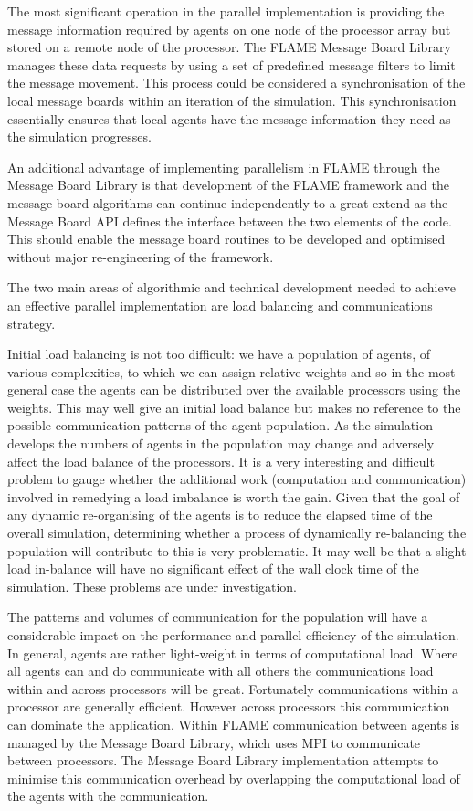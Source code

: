 The most significant operation in the parallel implementation is providing the message information required by agents on one node of the processor array but stored on a remote node of the processor. The FLAME Message Board Library manages these data requests by using a set of predefined message filters to limit the message movement. This process could be considered a synchronisation of the local message boards within an iteration of the simulation. This synchronisation essentially ensures that local agents have the message information they need as the simulation progresses.

An additional advantage of implementing parallelism in FLAME through the Message Board Library is that development of the FLAME framework and the message board algorithms can continue independently to a great extend as the Message Board API defines the interface between the two elements of the code. This should enable the message board routines to be developed and optimised without major re-engineering of the framework.

The two main areas of algorithmic and technical development needed to achieve an effective parallel implementation are load balancing and communications strategy. 

Initial load balancing is not too difficult: we have a population of agents, of various complexities, to which we can assign relative weights and so in the most general case the agents can be distributed over the available processors using the weights. This may well give an initial load balance but makes no reference to the possible communication patterns of the agent population. As the simulation develops the numbers of agents in the population may change and adversely affect the load balance of the processors. It is a very interesting and difficult problem to gauge whether the additional work (computation and communication) involved in remedying a load imbalance  is worth the gain. Given that the goal of any dynamic re-organising of the agents is to reduce the elapsed time of the overall simulation, determining whether a process of dynamically re-balancing the population will contribute to this is very problematic. It may well be that a slight load in-balance will have no significant effect of the wall clock time of the simulation. These problems are under investigation.

The patterns and volumes of communication for the population will have a considerable impact on the performance and parallel efficiency of the simulation. In general, agents are rather light-weight in terms of computational load. Where all agents can and do communicate with all others the communications load within and across processors will be great. Fortunately communications within a processor are generally efficient. However across processors this communication can dominate the application. Within FLAME communication between agents is managed by the Message Board Library, which uses MPI to communicate between processors. The Message Board Library implementation attempts to minimise this communication overhead by overlapping the computational load of the agents with the communication. 

